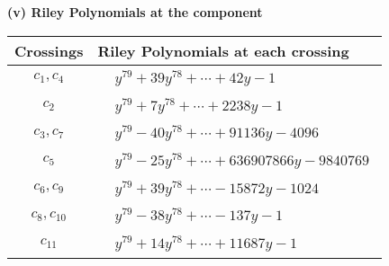 \documentclass[1p]{elsarticle_modified}
\theoremstyle{definition}
\begin{document}
\flushleft \textbf{(v) Riley Polynomials at the component}\newline \\
\begin{tabular}{m{50pt}|m{274pt}}
Crossings & \hspace{64pt}Riley Polynomials at each crossing \\
\hline $$\begin{aligned}c_{1},c_{4}\end{aligned}$$&$\begin{aligned}
&y^{79}+39 y^{78}+\cdots+42 y-1
\end{aligned}$\\
\hline $$\begin{aligned}c_{2}\end{aligned}$$&$\begin{aligned}
&y^{79}+7 y^{78}+\cdots+2238 y-1
\end{aligned}$\\
\hline $$\begin{aligned}c_{3},c_{7}\end{aligned}$$&$\begin{aligned}
&y^{79}-40 y^{78}+\cdots+91136 y-4096
\end{aligned}$\\
\hline $$\begin{aligned}c_{5}\end{aligned}$$&$\begin{aligned}
&y^{79}-25 y^{78}+\cdots+636907866 y-9840769
\end{aligned}$\\
\hline $$\begin{aligned}c_{6},c_{9}\end{aligned}$$&$\begin{aligned}
&y^{79}+39 y^{78}+\cdots-15872 y-1024
\end{aligned}$\\
\hline $$\begin{aligned}c_{8},c_{10}\end{aligned}$$&$\begin{aligned}
&y^{79}-38 y^{78}+\cdots-137 y-1
\end{aligned}$\\
\hline $$\begin{aligned}c_{11}\end{aligned}$$&$\begin{aligned}
&y^{79}+14 y^{78}+\cdots+11687 y-1
\end{aligned}$\\
\hline
\end{tabular}\\~\\
\end{document}
